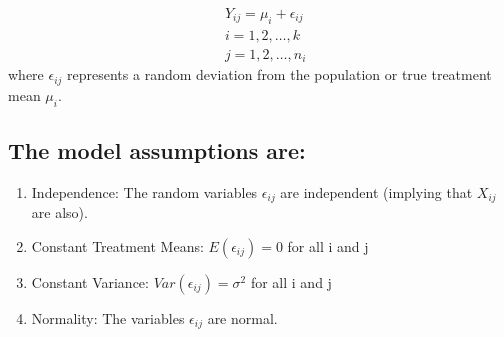 \documentclass{article}
\begin{document}
            \begin{align*}
                &Y_{ij} = \mu_{i} + \epsilon_{ij}\\
                &i = 1, 2, \dots , k\\
                &j = 1, 2, \dots ,n_{i}
            \end{align*}
            where $\epsilon_{ij}$ represents a random deviation from the population or true treatment 
            mean $\mu_{i}$.

            \subsection*{The model assumptions are:}
            \begin{enumerate}
                \item Independence: The random variables $\epsilon_{ij}$ are independent (implying that $X_{ij}$ are also).
                \item Constant Treatment Means: $E(\epsilon_{ij}) = 0$ for all i and j
                \item Constant Variance: $Var(\epsilon_{ij}) = \sigma^{2}$ for all i and j
                \item Normality: The variables $\epsilon_{ij}$ are normal.
            \end{enumerate}
            
\end{document}
